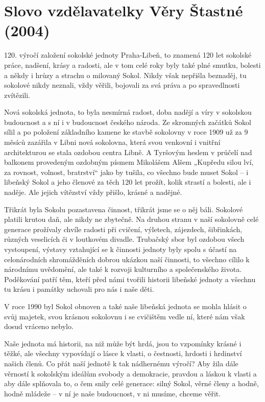 \section{Slovo vzdělavatelky Věry Štastné
(2004)}\label{slovo-vzdux11blavatelky-vux11bry-ux161tastnuxe9-2004}

120. výročí založení sokolské jednoty Praha-Libeň, to znamená 120 let
sokolské práce, nadšení, krásy a radosti, ale v tom celé roky byly také
plné smutku, bolesti a někdy i hrůzy a strachu o milovaný Sokol. Nikdy
však nepřišla beznaděj, tu sokolové nikdy neznali, vždy věřili, bojovali
za svá práva a po spravedlnosti zvítězili.

Nová sokolská jednota, to byla nesmírná radost, doba nadějí a víry v
sokolskou budoucnost a s ní i v budoucnost českého národa. Ze skromných
začátků Sokol sílil a po položení základního kamene ke stavbě sokolovny
v roce 1909 už za 9 měsíců zazářila v Libni nová sokolovna, která svou
venkovní i vnitřní architekturou se stala ozdobou centra Libně. A
Tyršovým heslem v průčelí nad balkonem provedeným ozdobným písmem
Mikolášem Alšem „Kupředu silou lví, za rovnost, volnost, bratrství``
jako by tušila, co všechno bude muset Sokol --⁠⁠⁠⁠⁠⁠ i libeňský Sokol a jeho
členové za těch 120 let prožít, kolik strastí a bolesti, ale i naděje.
Ale jejich vítězství vždy přišlo, krásné a nadějné.

Třikrát byla Sokolu pozastavena činnost, třikrát jsme se o něj báli.
Sokolové platili krutou daň, ale nikdy ne zbytečně. Na druhou stranu v
naší sokolovně celé generace prožívaly chvíle radosti při cvičení,
výletech, zájezdech, šibřinkách, různých veselicích či v loutkovém
divadle. Trubačský sbor byl ozdobou všech vystoupení, výstavy vztahující
se k činnosti jednoty byly spolu s účastí na celonárodních shromážděních
dobrou ukázkou naší činnosti, to všechno cílilo k národnímu uvědomění,
ale také k rozvoji kulturního a společenského života. Poděkování patří
těm, kteří před námi tvořili historii libeňské jednoty a všechnu tu
krásu i památky uchovali pro nás i naše děti.

V roce 1990 byl Sokol obnoven a také naše libeňská jednota se mohla
hlásit o svůj majetek, svou krásnou sokolovnu i se cvičištěm vedle ní,
které nám však dosud vráceno nebylo.

Naše jednota má historii, na niž může být hrdá, jsou to vzpomínky krásné
i těžké, ale všechny vypovídají o lásce k vlasti, o čestnosti, hrdosti i
hrdinství našich členů. Co přát naší jednotě k tak nádhernému výročí?
Aby žila dále věrností k sokolským ideálům svobody a demokracie, pravdou
a láskou k vlasti a aby dále splňovala to, o čem snily celé generace:
silný Sokol, věrné členy a hodně, hodně mládeže --⁠⁠⁠⁠⁠⁠ v ní je naše
budoucnost, v ni musíme, chceme věřit.


